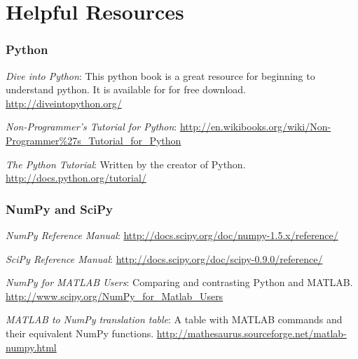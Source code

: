 %

\section*{Helpful Resources}
\subsubsection*{Python}
\noindent \emph{Dive into Python}:  This python book is a great resource for beginning to understand python.  It is available for for free download. \url{http://diveintopython.org/}

\noindent \emph{Non-Programmer's Tutorial for Python}: \url{http://en.wikibooks.org/wiki/Non-Programmer\%27s_Tutorial_for_Python}

\noindent \emph{The Python Tutorial}: Written by the creator of Python. \url{http://docs.python.org/tutorial/}

\subsubsection*{NumPy and SciPy}
\noindent \emph{NumPy Reference Manual}: \url{http://docs.scipy.org/doc/numpy-1.5.x/reference/}

\noindent \emph{SciPy Reference Manual}: \url{http://docs.scipy.org/doc/scipy-0.9.0/reference/}

\noindent \emph{NumPy for MATLAB Users}: Comparing and contrasting Python and MATLAB. \url{http://www.scipy.org/NumPy_for_Matlab_Users}

\noindent \emph{MATLAB to NumPy translation table}: A table with MATLAB commands and their equivalent NumPy functions.   \url{http://mathesaurus.sourceforge.net/matlab-numpy.html}

